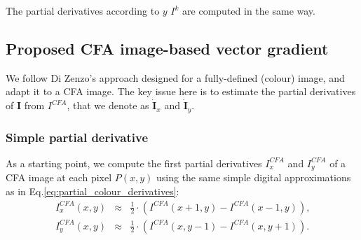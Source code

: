 \documentclass[twoside]{article}
\begin{document}
The partial derivatives according to $y$ $I^k$ are computed in the same way.



\subsection{Proposed CFA image-based vector gradient}
\label{subsec:cfa_gradient}

We follow Di Zenzo's approach designed for a fully-defined (colour) image, and adapt it to a CFA image. The key issue here is to estimate the partial derivatives of $\mathbf{I}$ from $I^{CFA}$, that we denote as $\dot{\textbf{I}}_x$ and $\dot{\textbf{I}}_y$.


\subsubsection{Simple partial derivative}

As a starting point, we compute the first partial derivatives $I_x^{CFA}$ and $I_y^{CFA}$ of a CFA image at each pixel $P(x,y)$ using the same simple digital approximations as in Eq.\eqref{eq:partial_colour_derivatives}:
\begin{equation}
	\begin{array}{rcl}
		I^{CFA}_x(x,y) &\approx& \frac{1}{2} \cdot \left( I^{CFA}(x+1,y) - I^{CFA}(x-1,y) \right) \text{,} \\
		I^{CFA}_y(x,y) &\approx& \frac{1}{2} \cdot \left( I^{CFA}(x,y-1) - I^{CFA}(x,y+1) \right) \text{.}
	\end{array}
\label{eq:partial_cfa_derivatives}
\end{equation}
\end{document}
